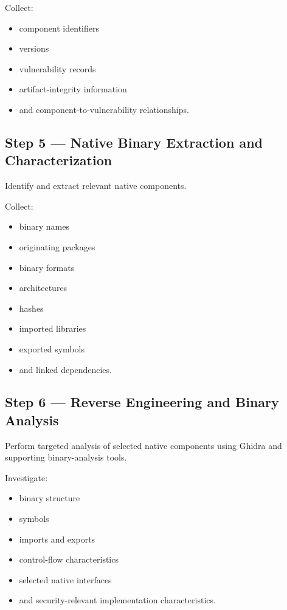 \documentclass[
  12pt,
  letterpaper,
  oneside]{report}
\providecommand{\tightlist}{%
  \setlength{\itemsep}{0pt}\setlength{\parskip}{0pt}}
\begin{document}
Collect:

\begin{itemize}
\tightlist
\item
  component identifiers
\item
  versions
\item
  vulnerability records
\item
  artifact-integrity information
\item
  and component-to-vulnerability relationships.
\end{itemize}

\subsection{Step 5 --- Native Binary Extraction and
Characterization}\label{step-5--native-binary-extraction-and-characterization}

Identify and extract relevant native components.

Collect:

\begin{itemize}
\tightlist
\item
  binary names
\item
  originating packages
\item
  binary formats
\item
  architectures
\item
  hashes
\item
  imported libraries
\item
  exported symbols
\item
  and linked dependencies.
\end{itemize}

\subsection{Step 6 --- Reverse Engineering and Binary
Analysis}\label{step-6--reverse-engineering-and-binary-analysis}

Perform targeted analysis of selected native components using Ghidra and
supporting binary-analysis tools.

Investigate:

\begin{itemize}
\tightlist
\item
  binary structure
\item
  symbols
\item
  imports and exports
\item
  control-flow characteristics
\item
  selected native interfaces
\item
  and security-relevant implementation characteristics.
\end{itemize}
\end{document}
